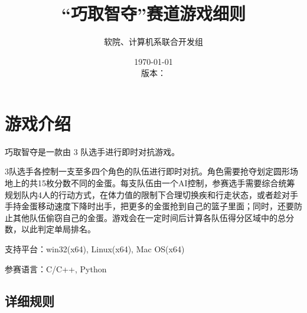 \documentclass[UTF8]{article}
\title{“巧取智夺”赛道游戏细则}
\author{软院、计算机系联合开发组}
\date{\today\\版本：\gitAbbrevHash}
\begin{document}
\maketitle


\section{游戏介绍}

巧取智夺是一款由 3 队选手进行即时对抗游戏。

3队选手各控制一支至多四个角色的队伍进行即时对抗。角色需要抢夺划定圆形场地上的共15枚分数不同的金蛋。每支队伍由一个AI控制，参赛选手需要综合统筹规划队内4人的行动方式，在体力值的限制下合理切换疾和行走状态，或者趁对手手持金蛋移动速度下降时出手，把更多的金蛋抢到自己的篮子里面；同时，还要防止其他队伍偷窃自己的金蛋。游戏会在一定时间后计算各队伍得分区域中的总分数，以此判定单局排名。

支持平台：win32(x64), Linux(x64), Mac OS(x64)

参赛语言：C/C++, Python

\hypertarget{header-n7}{%
\subsection{详细规则}\label{header-n7}}
\end{document}

